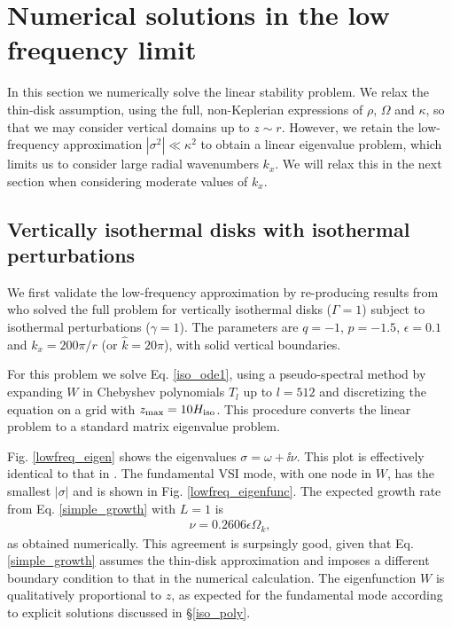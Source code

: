 \section{Numerical solutions in the low frequency limit}
In this section we numerically solve the linear stability problem.  
We relax the thin-disk assumption, using the full, non-Keplerian
expressions of $\rho$, $\Omega$ and $\kappa$, so that we may consider
vertical domains up to $z\sim r$. However, we retain the low-frequency
approximation $|\sigma^2|\ll\kappa^2$ to obtain a linear eigenvalue
problem, which limits us to consider large radial wavenumbers
$k_x$. We will relax this in the next section when considering
moderate values of $k_x$. %



\subsection{Vertically isothermal disks with isothermal perturbations}   
We first validate the low-frequency approximation by re-producing
results from \cite{mcnally14} who solved the full problem for
vertically isothermal disks ($\Gamma=1$) subject to isothermal
perturbations ($\gamma=1$). The parameters are $q=-1$,
$p=-1.5$, $\epsilon=0.1$ and $k_x = 200\pi/r$ (or $\hat{k} = 20\pi$),
with solid vertical boundaries. 

For this problem we solve Eq. \ref{iso_ode1}, using a pseudo-spectral
method by expanding $W$ in Chebyshev polynomials $T_l$ up to $l=512$
and discretizing the equation on a grid with
$z_\mathrm{max}=10H_\mathrm{iso}$. This procedure converts the linear problem
to a standard matrix eigenvalue problem.   

Fig. \ref{lowfreq_eigen} shows the eigenvalues $\sigma = \omega +
\ii\nu$. This plot is effectively identical to that in
\cite{mcnally14}. The fundamental VSI mode, with one node in $W$, has
the smallest $|\sigma|$ and is shown in Fig. \ref{lowfreq_eigenfunc}.  
The expected growth rate from Eq. \ref{simple_growth} with 
$L=1$ is  
\begin{align*}
  \nu = 0.2606\epsilon\Omega_k,
\end{align*}
as obtained numerically. This agreement is surpsingly good, given that
Eq. \ref{simple_growth} assumes the thin-disk approximation and
imposes a different boundary condition to that in the numerical
calculation. The eigenfunction $W$ is qualitatively proportional to
$z$, as expected for the fundamental mode according to explicit
solutions discussed in \S\ref{iso_poly}.    

